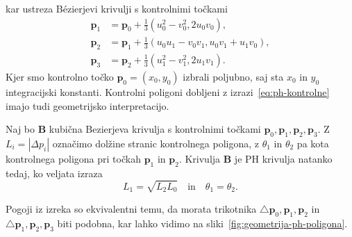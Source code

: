 \documentclass[isrm2, tisk]{fmfdelo}
\newcommand{\p}{\mathbf{p}}
\begin{document}
    kar ustreza Bézierjevi krivulji s kontrolnimi točkami
    \begin{align}
        \p_1 &=\p_0+\frac{1}{3}(u_0^2-v_0^2,2u_0v_0), \nonumber\\
        \p_2 &= \p_1+\frac{1}{3}(u_0u_1-v_0v_1, u_0v_1+u_1v_0),\nonumber\\
        \p_3 &= \p_2 + \frac{1}{3}(u_1^2-v_1^2, 2u_1v_1). \label{eq:ph-kontrolne}
    \end{align}
    Kjer smo kontrolno točko $\p_0=(x_0,y_0)$ izbrali poljubno, saj sta $x_0$ in $y_0$ integracijski konstanti.
    Kontrolni poligoni dobljeni z izrazi~\eqref{eq:ph-kontrolne} imajo tudi geometrijsko interpretacijo.
    \begin{izrek}
        \label{izrek:geometrija-ph-poligona}
        Naj bo $\mathbf{B}$ kubična Bezierjeva krivulja s kontrolnimi točkami $\p_0,\p_1,\p_2,\p_3$.
        Z $L_i=|\Delta p_i|$ označimo dolžine stranic kontrolnega poligona, z $\theta_1$ in $\theta_2$ pa kota kontrolnega poligona pri točkah $\p_1$ in  $\p_2$.
        Krivulja $\mathbf{B}$ je PH krivulja natanko tedaj, ko veljata izraza
        \[L_1=\sqrt{L_2L_0}\quad \text{in} \quad \theta_1=\theta_2 .\]
    \end{izrek}
    \noindent Pogoji iz izreka so ekvivalentni temu, da morata trikotnika $\triangle \p_0,\p_1,\p_2$ in $\triangle \p_1,\p_2,\p_3$ biti podobna, kar lahko vidimo na sliki~\ref{fig:geometrija-ph-poligona}.
\end{document}
